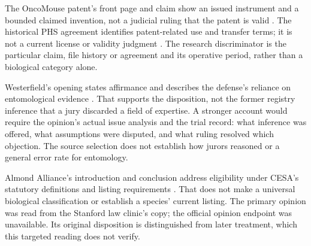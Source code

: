 \documentclass[
  english,
]{article}
\begin{document}
The OncoMouse patent's front page and claim show an issued instrument
and a bounded claimed invention, not a judicial ruling that the patent
is valid \citep{depth_oncomouse}. The historical PHS agreement
identifies patent-related use and transfer terms; it is not a current
license or validity judgment \citep{depth_phsmou}. The research
discriminator is the particular claim, file history or agreement and its
operative period, rather than a biological category alone.

Westerfield's opening states affirmance and describes the defense's
reliance on entomological evidence \citep{depth_westerfield}. That
supports the disposition, not the former registry inference that a jury
discarded a field of expertise. A stronger account would require the
opinion's actual issue analysis and the trial record: what inference was
offered, what assumptions were disputed, and what ruling resolved which
objection. The source selection does not establish how jurors reasoned
or a general error rate for entomology.

Almond Alliance's introduction and conclusion address eligibility under
CESA's statutory definitions and listing requirements
\citep{depth_almond}. That does not make a universal biological
classification or establish a species' current listing. The primary
opinion was read from the Stanford law clinic's copy; the official
opinion endpoint was unavailable. Its original disposition is
distinguished from later treatment, which this targeted reading does not
verify.
\end{document}
